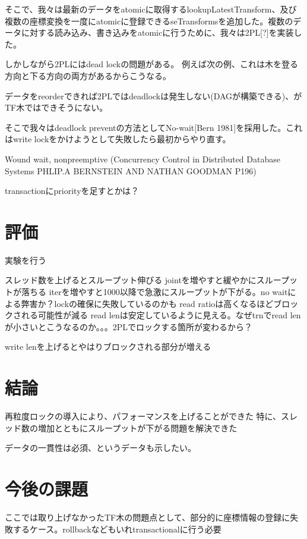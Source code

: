 \documentclass{jarticle}
\begin{document}
\begin{multicols}{2}
そこで、我々は最新のデータをatomicに取得するlookupLatestTransform、及び複数の座標変換を一度にatomicに登録できるseTransformsを追加した。複数のデータに対する読み込み、書き込みをatomicに行うために、我々は2PL[?]を実装した。

しかしながら2PLにはdead lockの問題がある。
例えば次の例、これは木を登る方向と下る方向の両方があるからこうなる。

データをreorderできれば2PLではdeadlockは発生しない(DAGが構築できる)、がTF木ではできそうにない。

そこで我々はdeadlock preventの方法としてNo-wait[Bern 1981]を採用した。これはwrite lockをかけようとして失敗したら最初からやり直す。

Wound wait, nonpreemptive (Concurrency Control in Distributed Database Systems PHLIP.A BERNSTEIN AND NATHAN GOODMAN P196)

transactionにpriorityを足すとかは？



\section{評価}
実験を行う

スレッド数を上げるとスループット伸びる
jointを増やすと緩やかにスループットが落ちる
iterを増やすと1000以降で急激にスループットが下がる。no waitによる弊害か？lockの確保に失敗しているのかも
read ratioは高くなるほどブロックされる可能性が減る
read lenは安定しているように見える。なぜtrnでread lenが小さいとこうなるのか。。。2PLでロックする箇所が変わるから？

write lenを上げるとやはりブロックされる部分が増える



\section{結論}

再粒度ロックの導入により、パフォーマンスを上げることができた
特に、スレッド数の増加とともにスループットが下がる問題を解決できた

データの一貫性は必須、というデータも示したい。

\section{今後の課題}

ここでは取り上げなかったTF木の問題点として、部分的に座標情報の登録に失敗するケース。rollbackなどもいれtransactionalに行う必要


\end{multicols}
\end{document}
